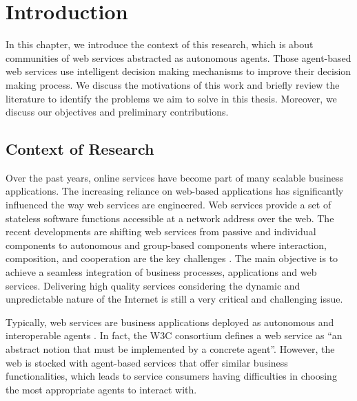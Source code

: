%

\setcounter{chapter}{0}

\chapter{Introduction}\label{sec:intro}
In this chapter, we introduce the context of this research, which is about communities of web services abstracted as autonomous agents. Those agent-based web services use intelligent decision making mechanisms to improve their decision making process. We discuss the motivations of this work and briefly review the literature to identify the problems we aim to solve in this thesis. Moreover, we discuss our objectives and preliminary contributions.

\section{Context of Research}\label{sec:motivation}

Over the past years, online services have become part of many
scalable business applications. The increasing reliance on
web-based applications has significantly influenced the way web
services are engineered. Web services provide a set of stateless
software functions accessible at a network address over the web.
The recent developments are shifting web services from passive and
individual components to autonomous and group-based components
where interaction, composition, and cooperation are the key
challenges \cite{ICWS2011-1,SCC2011-1}. The main objective is to
achieve a seamless integration of business processes, applications
and web services. Delivering high quality services considering the
dynamic and unpredictable nature of the Internet is still a very
critical and challenging issue.

Typically, web services are business applications deployed as
autonomous and interoperable agents \cite{Alescio}. In fact, the
W3C consortium defines a web service as ``an abstract notion that
must be implemented by a concrete agent''. However, the web is
stocked with agent-based services that offer similar business
functionalities, which leads to service consumers having
difficulties in choosing the most appropriate agents to interact
with.

